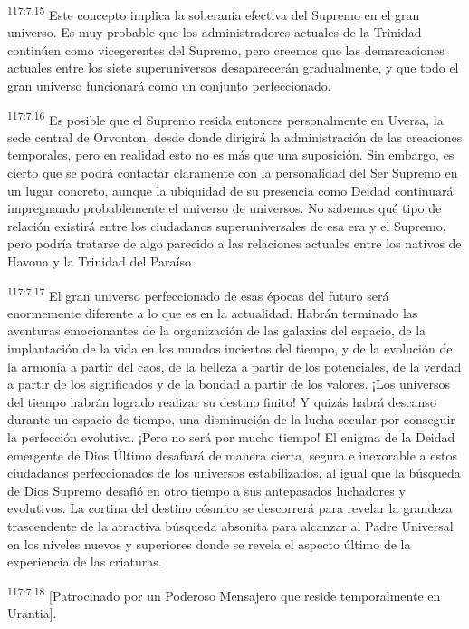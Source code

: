 \par
\textsuperscript{117:7.15} Este concepto implica la soberanía efectiva del Supremo en el gran universo. Es muy probable que los administradores actuales de la Trinidad continúen como vicegerentes del Supremo, pero creemos que las demarcaciones actuales entre los siete superuniversos desaparecerán gradualmente, y que todo el gran universo funcionará como un conjunto perfeccionado.

\par
\textsuperscript{117:7.16} Es posible que el Supremo resida entonces personalmente en Uversa, la sede central de Orvonton, desde donde dirigirá la administración de las creaciones temporales, pero en realidad esto no es más que una suposición. Sin embargo, es cierto que se podrá contactar claramente con la personalidad del Ser Supremo en un lugar concreto, aunque la ubiquidad de su presencia como Deidad continuará impregnando probablemente el universo de universos. No sabemos qué tipo de relación existirá entre los ciudadanos superuniversales de esa era y el Supremo, pero podría tratarse de algo parecido a las relaciones actuales entre los nativos de Havona y la Trinidad del Paraíso.

\par
\textsuperscript{117:7.17} El gran universo perfeccionado de esas épocas del futuro será enormemente diferente a lo que es en la actualidad. Habrán terminado las aventuras emocionantes de la organización de las galaxias del espacio, de la implantación de la vida en los mundos inciertos del tiempo, y de la evolución de la armonía a partir del caos, de la belleza a partir de los potenciales, de la verdad a partir de los significados y de la bondad a partir de los valores. ¡Los universos del tiempo habrán logrado realizar su destino finito! Y quizás habrá descanso durante un espacio de tiempo, una disminución de la lucha secular por conseguir la perfección evolutiva. ¡Pero no será por mucho tiempo! El enigma de la Deidad emergente de Dios Último desafiará de manera cierta, segura e inexorable a estos ciudadanos perfeccionados de los universos estabilizados, al igual que la búsqueda de Dios Supremo desafió en otro tiempo a sus antepasados luchadores y evolutivos. La cortina del destino cósmico se descorrerá para revelar la grandeza trascendente de la atractiva búsqueda absonita para alcanzar al Padre Universal en los niveles nuevos y superiores donde se revela el aspecto último de la experiencia de las criaturas.

\par
\textsuperscript{117:7.18} [Patrocinado por un Poderoso Mensajero que reside temporalmente en Urantia].